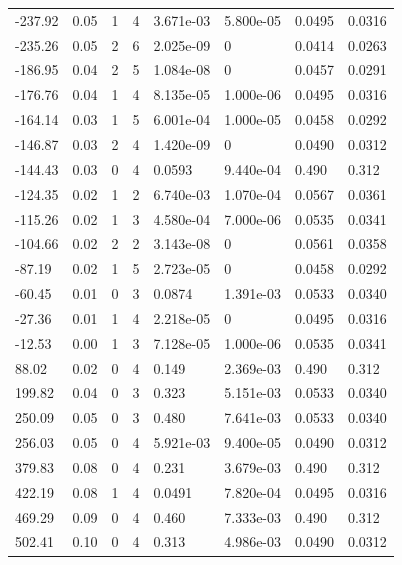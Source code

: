 \documentclass[preview]{standalone}
\begin{document}
{{\begin{tabular}{L{1.2cm}C{1.2cm} C{0.3cm}C{0.5cm} C{1.4cm}C{1.4cm} C{1.4cm}C{1.4cm}}
  -237.92  &  0.05  & 1     &  4 &  3.671e-03  & 5.800e-05  & 0.0495 &  0.0316   \\ 
  -235.26  &  0.05  & 2     &  6 &  2.025e-09  & 0  & 0.0414 &  0.0263   \\ 
  -186.95  &  0.04  & 2     &  5 &  1.084e-08  & 0  & 0.0457 &  0.0291   \\ 
  -176.76  &  0.04  & 1     &  4 &  8.135e-05  & 1.000e-06  & 0.0495 &  0.0316   \\ 
  -164.14  &  0.03  & 1     &  5 &  6.001e-04  & 1.000e-05  & 0.0458 &  0.0292   \\ 
  -146.87  &  0.03  & 2     &  4 &  1.420e-09  & 0  & 0.0490 &  0.0312   \\ 
  -144.43  &  0.03  & 0     &  4 &  0.0593  & 9.440e-04  & 0.490 &  0.312   \\ 
  -124.35  &  0.02  & 1     &  2 &  6.740e-03  & 1.070e-04  & 0.0567 &  0.0361   \\ 
  -115.26  &  0.02  & 1     &  3 &  4.580e-04  & 7.000e-06  & 0.0535 &  0.0341   \\ 
  -104.66  &  0.02  & 2     &  2 &  3.143e-08  & 0  & 0.0561 &  0.0358   \\ 
  -87.19  &  0.02  & 1     &  5 &  2.723e-05  & 0  & 0.0458 &  0.0292   \\ 
  -60.45  &  0.01  & 0     &  3 &  0.0874  & 1.391e-03  & 0.0533 &  0.0340   \\ 
  -27.36  &  0.01  & 1     &  4 &  2.218e-05  & 0  & 0.0495 &  0.0316   \\ 
  -12.53  &  0.00  & 1     &  3 &  7.128e-05  & 1.000e-06  & 0.0535 &  0.0341   \\ 
  88.02  &  0.02  & 0     &  4 &  0.149  & 2.369e-03  & 0.490 &  0.312   \\ 
  199.82  &  0.04  & 0     &  3 &  0.323  & 5.151e-03  & 0.0533 &  0.0340   \\ 
  250.09  &  0.05  & 0     &  3 &  0.480  & 7.641e-03  & 0.0533 &  0.0340   \\ 
  256.03  &  0.05  & 0     &  4 &  5.921e-03  & 9.400e-05  & 0.0490 &  0.0312   \\ 
  379.83  &  0.08  & 0     &  4 &  0.231  & 3.679e-03  & 0.490 &  0.312   \\ 
  422.19  &  0.08  & 1     &  4 &  0.0491  & 7.820e-04  & 0.0495 &  0.0316   \\ 
  469.29  &  0.09  & 0     &  4 &  0.460  & 7.333e-03  & 0.490 &  0.312   \\ 
  502.41  &  0.10  & 0     &  4 &  0.313  & 4.986e-03  & 0.0490 &  0.0312   \\ 

\end{tabular}}}
\end{document}
